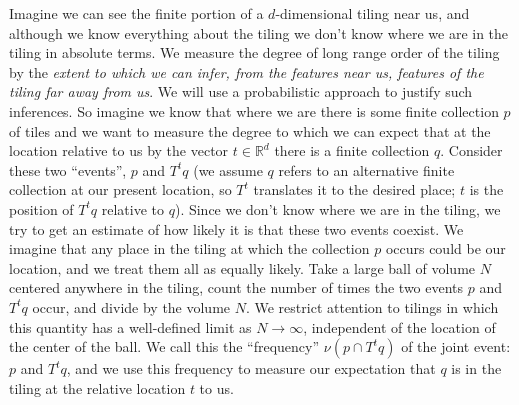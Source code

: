 \documentclass[reqno]{stml-l}
\theoremstyle{plain}
\theoremstyle{definition}
\numberwithin{equation}{chapter}
\begin{document}
Imagine we can see the finite portion of a $d$-dimensional tiling near us, and although we know everything about the tiling we don't
know where we are in the tiling in absolute terms. We measure the degree of long range order of the tiling by the \emph{extent to which we can infer, from the features near us, features of the tiling far away from us}. We will use a probabilistic approach to justify such inferences. So imagine we know that where we are there is some finite collection $p$ of tiles and we want to measure the degree to which we can expect that at the location relative to us by the vector $t\in \mathbb{R}^{d}$ there is a finite collection $q$. Consider these two ``events'', $p$ and $T^{t}q$ (we assume $q$ refers to an alternative finite collection at our present location, so $T^{t}$ translates it to the desired place; $t$ is the position of $T^{t}q$ relative to $q$). Since we don't know where we are in the tiling, we try to get an estimate of how likely it is that these two events coexist. We imagine that any place in the tiling at which the collection $p$ occurs could be our location, and we treat them all as equally likely. Take a large ball of volume $N$ centered anywhere in the tiling, count the number of times the two events $p$ and $T^{t}q$ occur, and divide by the volume $N$. We restrict attention to tilings in which this quantity has a well-defined limit as $N\rightarrow\infty$, independent of the location of the center of the ball. We call this the ``frequency'' $\nu(p\cap T^{t}q)$ of the joint event: $p$ and $T^{t}q$, and we use this frequency to measure our expectation that $q$ is in the tiling at the relative location $t$ to us.
\end{document}
